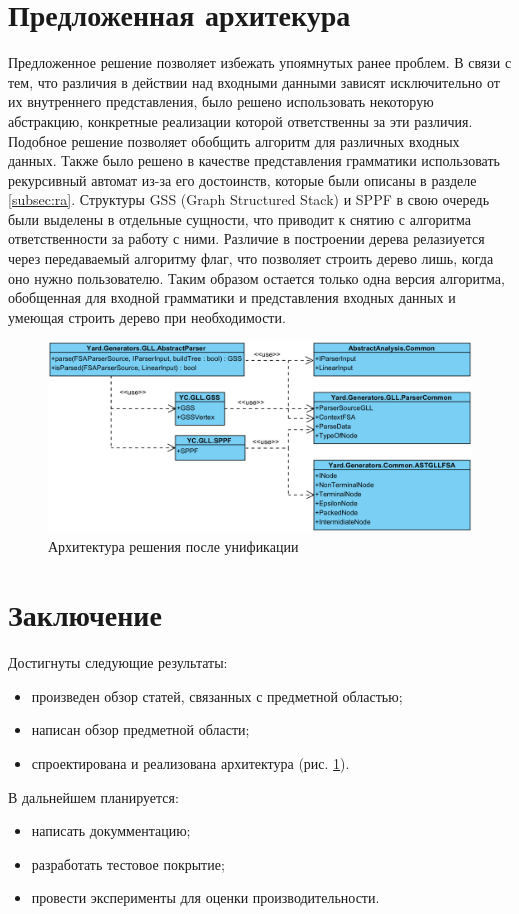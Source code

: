 \documentclass[14pt]{matmex-diploma}
\begin{document}
\section{Предложенная архитекура}
Предложенное решение позволяет избежать упоямнутых ранее проблем. В связи с тем, что различия в действии над входными данными зависят исключительно от их внутреннего представления, было решено использовать некоторую абстракцию, конкретные реализации которой ответственны за эти различия. Подобное решение позволяет обобщить алгоритм для различных входных данных. Также было решено в качестве представления грамматики использовать рекурсивный автомат из-за его достоинств, которые были описаны в разделе \ref{subsec:ra}. Структуры GSS (Graph Structured Stack) и SPPF в свою очередь были выделены в отдельные сущности, что приводит к снятию с алгоритма ответственности за работу с ними. Различие в построении дерева релазиуется через передаваемый алгоритму флаг, что позволяет строить дерево лишь, когда оно нужно пользователю. Таким образом остается только одна версия алгоритма, обобщенная для входной грамматики и представления входных данных и умеющая строить дерево при необходимости.
\begin{figure}[h]
    \includegraphics[width=\textwidth]{images/New}
    \caption{Архитектура решения после унификации}
    \label{fig:New}
\end{figure}

\section{Заключение}
Достигнуты следующие результаты:
\begin{itemize}
    \item произведен обзор статей, связанных с предметной областью;
    \item написан обзор предметной области;
    \item спроектирована и реализована архитектура (рис. \ref{fig:New}).
\end{itemize}
В дальнейшем планируется:
\begin{itemize}
    \item написать докумментацию;
    \item разработать тестовое покрытие;
    \item провести эксперименты для оценки производительности.
\end{itemize}

\setmonofont[Mapping=tex-text]{CMU Typewriter Text}


\end{document}
